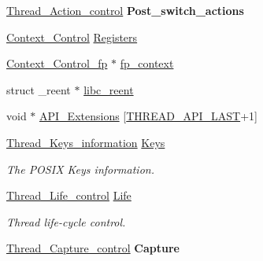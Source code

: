 \begin{DoxyCompactItemize}
\item 
\mbox{\label{struct__Thread__Control_a1e3786435c45cae64a2d750be0203835}} 
\mbox{\hyperlink{structThread__Action__control}{Thread\+\_\+\+Action\+\_\+control}} {\bfseries Post\+\_\+switch\+\_\+actions}
\item 
\mbox{\hyperlink{structContext__Control}{Context\+\_\+\+Control}} \mbox{\hyperlink{struct__Thread__Control_a0a29cd9033f1b047dfa0877e6ddb4bbe}{Registers}}
\item 
\mbox{\hyperlink{structContext__Control__fp}{Context\+\_\+\+Control\+\_\+fp}} $\ast$ \mbox{\hyperlink{struct__Thread__Control_a3ade3a2297638311de958b5f82639c9d}{fp\+\_\+context}}
\item 
struct \+\_\+reent $\ast$ \mbox{\hyperlink{struct__Thread__Control_af33017bd9e4bb1a83e49162cb9bc56cd}{libc\+\_\+reent}}
\item 
void $\ast$ \mbox{\hyperlink{struct__Thread__Control_a8a8b7acd4599351bd8efcd032b6d86f4}{A\+P\+I\+\_\+\+Extensions}} \mbox{[}\mbox{\hyperlink{group__RTEMSScoreThread_gae9eede8eaa139d657213be4d38a5f756}{T\+H\+R\+E\+A\+D\+\_\+\+A\+P\+I\+\_\+\+L\+A\+ST}}+1\mbox{]}
\item 
\mbox{\label{struct__Thread__Control_a49224761fdc1d11b136fe75dbe0783a9}} 
\mbox{\hyperlink{structThread__Keys__information}{Thread\+\_\+\+Keys\+\_\+information}} \mbox{\hyperlink{struct__Thread__Control_a49224761fdc1d11b136fe75dbe0783a9}{Keys}}
\begin{DoxyCompactList}\small\item\em The P\+O\+S\+IX Keys information. \end{DoxyCompactList}\item 
\mbox{\hyperlink{structThread__Life__control}{Thread\+\_\+\+Life\+\_\+control}} \mbox{\hyperlink{struct__Thread__Control_a9d1a643fb09a4ed7ab24728b6c8c4962}{Life}}
\begin{DoxyCompactList}\small\item\em Thread life-\/cycle control. \end{DoxyCompactList}\item 
\mbox{\label{struct__Thread__Control_a4041befb56db3e2c85767c54b946bca6}} 
\mbox{\hyperlink{structThread__Capture__control}{Thread\+\_\+\+Capture\+\_\+control}} {\bfseries Capture}
\item 
\mbox{\label{struct__Thread__Control_ae713ecc17e088572e42afdbe076c8149}} 

\end{DoxyCompactItemize}
